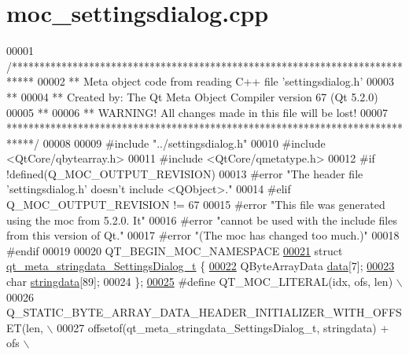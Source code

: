 \hypertarget{a00018_source}{\section{moc\+\_\+settingsdialog.\+cpp}
\label{a00018_source}
}

\begin{DoxyCode}
00001 \textcolor{comment}{/****************************************************************************}
00002 \textcolor{comment}{** Meta object code from reading C++ file 'settingsdialog.h'}
00003 \textcolor{comment}{**}
00004 \textcolor{comment}{** Created by: The Qt Meta Object Compiler version 67 (Qt 5.2.0)}
00005 \textcolor{comment}{**}
00006 \textcolor{comment}{** WARNING! All changes made in this file will be lost!}
00007 \textcolor{comment}{*****************************************************************************/}
00008 
00009 \textcolor{preprocessor}{#include "../settingsdialog.h"}
00010 \textcolor{preprocessor}{#include <QtCore/qbytearray.h>}
00011 \textcolor{preprocessor}{#include <QtCore/qmetatype.h>}
00012 \textcolor{preprocessor}{#if !defined(Q\_MOC\_OUTPUT\_REVISION)}
00013 \textcolor{preprocessor}{#error "The header file 'settingsdialog.h' doesn't include <QObject>."}
00014 \textcolor{preprocessor}{#elif Q\_MOC\_OUTPUT\_REVISION != 67}
00015 \textcolor{preprocessor}{#error "This file was generated using the moc from 5.2.0. It"}
00016 \textcolor{preprocessor}{#error "cannot be used with the include files from this version of Qt."}
00017 \textcolor{preprocessor}{#error "(The moc has changed too much.)"}
00018 \textcolor{preprocessor}{#endif}
00019 
00020 QT\_BEGIN\_MOC\_NAMESPACE
\hypertarget{a00018_source_l00021}{}\hyperlink{a00018}{00021} \textcolor{keyword}{struct }\hyperlink{a00018_d4/d98/a00120}{qt\_meta\_stringdata\_SettingsDialog\_t} \{
\hypertarget{a00018_source_l00022}{}\hyperlink{a00018_a320edc752a589bd0171189d51579680e}{00022}     QByteArrayData \hyperlink{a00018_a320edc752a589bd0171189d51579680e}{data}[7];
\hypertarget{a00018_source_l00023}{}\hyperlink{a00018_ab803985b8fecb8e67a35ab5a3939845b}{00023}     \textcolor{keywordtype}{char} \hyperlink{a00018_ab803985b8fecb8e67a35ab5a3939845b}{stringdata}[89];
00024 \};
\hypertarget{a00018_source_l00025}{}\hyperlink{a00018_a75bb9482d242cde0a06c9dbdc6b83abe}{00025} \textcolor{preprocessor}{#define QT\_MOC\_LITERAL(idx, ofs, len) \(\backslash\)}
00026 \textcolor{preprocessor}{    Q\_STATIC\_BYTE\_ARRAY\_DATA\_HEADER\_INITIALIZER\_WITH\_OFFSET(len, \(\backslash\)}
00027 \textcolor{preprocessor}{    offsetof(qt\_meta\_stringdata\_SettingsDialog\_t, stringdata) + ofs \(\backslash\)}

\end{DoxyCode}
